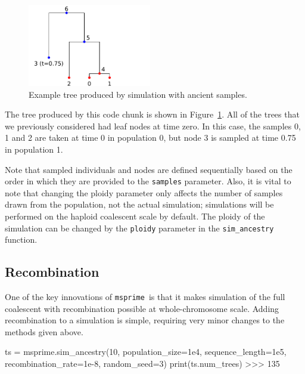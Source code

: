 \documentclass[graybox]{svmult}
\newcommand{\msprime}[0]{\texttt{msprime}}
\begin{document}
\begin{figure}[t]
\centering
\includegraphics[width=0.48\textwidth]{images/plot_9.pdf}
\caption{\label{fig-tree-ancient-samples} Example tree produced by simulation
with ancient samples.}
\end{figure}

The tree produced by this code chunk is shown in Figure~\ref{fig-tree-ancient-samples}.
All of the trees that we previously considered had leaf nodes at time
zero. In this case, the samples 0, 1 and 2 are taken at time 0 in
population 0, but node 3 is sampled at time 0.75 in population 1.

Note that sampled individuals and nodes are defined sequentially based
on the order in which they are provided to the \texttt{samples} parameter. Also, it is vital
to note that changing the ploidy parameter only affects the number of samples drawn from
the population, not the actual simulation; simulations will be performed on the
haploid coalescent scale by default. The ploidy of the simulation can be changed by the
\texttt{ploidy} parameter in the \texttt{sim\_ancestry} function.


\subsection{Recombination}\label{recombination}

One of the key innovations of \msprime\ is that it makes simulation of the
full coalescent with recombination possible at whole-chromosome scale.
Adding recombination to a simulation is simple, requiring very minor
changes to the methods given above.

\begin{pythoncode}
ts = msprime.sim_ancestry(10, population_size=1e4, sequence_length=1e5, recombination_rate=1e-8, random_seed=3)
print(ts.num_trees)
>>> 135
\end{pythoncode}
\end{document}
